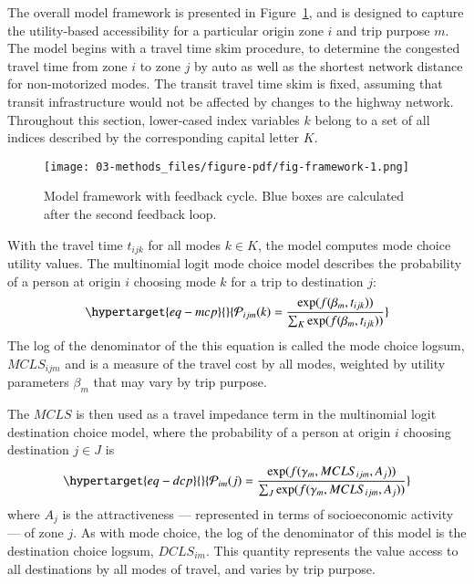 \documentclass[
  letterpaper,
  number,
  review,
  3p]{elsarticle}
\begin{document}
The overall model framework is presented in Figure~\ref{fig-framework},
and is designed to capture the utility-based accessibility for a
particular origin zone \(i\) and trip purpose \(m\). The model begins
with a travel time skim procedure, to determine the congested travel
time from zone \(i\) to zone \(j\) by auto as well as the shortest
network distance for non-motorized modes. The transit travel time skim
is fixed, assuming that transit infrastructure would not be affected by
changes to the highway network. Throughout this section, lower-cased
index variables \(k\) belong to a set of all indices described by the
corresponding capital letter \(K\).

\begin{figure}

{\centering \texttt{[image: 03-methods\_files/figure-pdf/fig-framework-1.png]}

}

\caption{\label{fig-framework}Model framework with feedback cycle. Blue
boxes are calculated after the second feedback loop.}

\end{figure}

With the travel time \(t_{ijk}\) for all modes \(k \in K\), the model
computes mode choice utility values. The multinomial logit mode choice
model describes the probability of a person at origin \(i\) choosing
mode \(k\) for a trip to destination \(j\):
\begin{equation}\protect\hypertarget{eq-mcp}{}{
\mathcal{P}_{ijm}(k) = \frac{\exp(f(\beta_{m}, t_{ijk}))}{\sum_{K}\exp(f(\beta_{m}, t_{ijk}))}
}\label{eq-mcp}\end{equation} The log of the denominator of the this
equation is called the mode choice logsum, \(MCLS_{ijm}\) and is a
measure of the travel cost by all modes, weighted by utility parameters
\(\beta_m\) that may vary by trip purpose.

The \(MCLS\) is then used as a travel impedance term in the multinomial
logit destination choice model, where the probability of a person at
origin \(i\) choosing destination \(j \in J\) is
\begin{equation}\protect\hypertarget{eq-dcp}{}{
\mathcal{P}_{im}(j) = \frac{\exp(f(\gamma_{m}, MCLS_{ijm}, A_j))}{\sum_{J}\exp(f(\gamma_{m}, MCLS_{ijm}, A_j))}
}\label{eq-dcp}\end{equation} where \(A_j\) is the attractiveness ---
represented in terms of socioeconomic activity --- of zone \(j\). As
with mode choice, the log of the denominator of this model is the
destination choice logsum, \(DCLS_{im}\). This quantity represents the
value access to all destinations by all modes of travel, and varies by
trip purpose.
\end{document}
